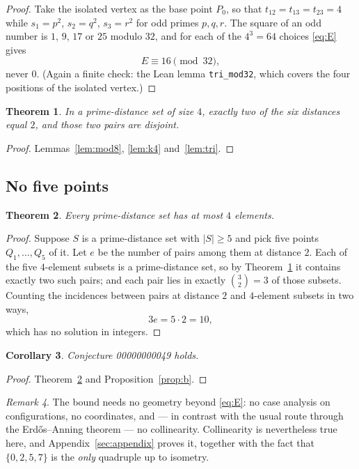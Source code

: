 \documentclass[11pt]{article}
\theoremstyle{plain}
\newtheorem{theorem}{Theorem}
\newtheorem{corollary}[theorem]{Corollary}
\theoremstyle{definition}
\theoremstyle{remark}
\newtheorem{remark}[theorem]{Remark}
\begin{document}
\begin{proof}
Take the isolated vertex as the base point $P_0$, so that $t_{12}=t_{13}=t_{23}=4$
while $s_1=p^2$, $s_2=q^2$, $s_3=r^2$ for odd primes $p,q,r$. The square of an
odd number is $1$, $9$, $17$ or $25$ modulo $32$, and for each of the $4^3=64$
choices \eqref{eq:E} gives
\[
  E\equiv16\pmod{32},
\]
never $0$. (Again a finite check: the Lean lemma \texttt{tri\_mod32}, which
covers the four positions of the isolated vertex.) \end{proof}

\begin{theorem}\label{thm:two}
In a prime-distance set of size $4$, exactly two of the six distances equal $2$,
and those two pairs are disjoint.
\end{theorem}

\begin{proof}
Lemmas~\ref{lem:mod8}, \ref{lem:k4} and~\ref{lem:tri}. \end{proof}

\subsection{No five points}

\begin{theorem}\label{thm:five}
Every prime-distance set has at most $4$ elements.
\end{theorem}

\begin{proof}
Suppose $S$ is a prime-distance set with $|S|\ge5$ and pick five points
$Q_1,\ldots,Q_5$ of it. Let $e$ be the number of pairs among them at distance
$2$. Each of the five $4$-element subsets is a prime-distance set, so by
Theorem~\ref{thm:two} it contains exactly two such pairs; and each pair lies in
exactly $\binom32=3$ of those subsets. Counting the incidences between pairs at
distance $2$ and $4$-element subsets in two ways,
\[
  3e=5\cdot2=10 ,
\]
which has no solution in integers. \end{proof}

\begin{corollary}
Conjecture 00000000049 holds.
\end{corollary}

\begin{proof}
Theorem~\ref{thm:five} and Proposition~\ref{prop:b}. \end{proof}

\begin{remark}
The bound needs no geometry beyond \eqref{eq:E}: no case analysis on
configurations, no coordinates, and --- in contrast with the usual route through
the Erd\H os--Anning theorem \cite{Anning} --- no collinearity. Collinearity is nevertheless
true here, and Appendix~\ref{sec:appendix} proves it, together with the fact
that $\{0,2,5,7\}$ is the \emph{only} quadruple up to isometry.
\end{remark}
\end{document}
